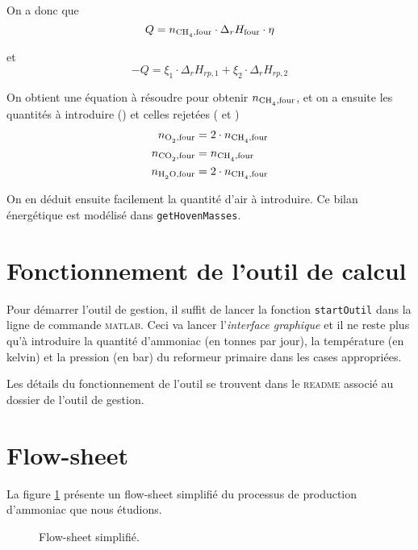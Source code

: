 On a donc que 
\[
	Q = n_{\ce{CH4},\text{four}} \cdot \Delta_r H_{\text{four}} \cdot \eta
\]

et 
\[
	-Q = \xi_1 \cdot \Delta_r H_{rp,1} + \xi_2 \cdot \Delta_r H_{rp,2}
\]

On obtient une équation à résoudre pour obtenir $n_{\ce{CH4},\text{four}}$, et on a ensuite
les quantités à introduire () et celles rejetées ( et )
\begin{align*}
	n_{\ce{O2},\text{four}} &= 2 \cdot n_{\ce{CH4},\text{four}} \\
	n_{\ce{CO2},\text{four}} &= n_{\ce{CH4},\text{four}} \\
	n_{\ce{H2O},\text{four}} &= 2 \cdot n_{\ce{CH4},\text{four}}
\end{align*}

On en déduit ensuite facilement la quantité d'air à introduire.
Ce bilan énergétique est modélisé dans \texttt{getHovenMasses}.



\section{Fonctionnement de l'outil de calcul}

Pour démarrer l'outil de gestion, il suffit de lancer la fonction \texttt{startOutil}
dans la ligne de commande \textsc{matlab}.
Ceci va lancer l'\emph{interface graphique} et il ne reste plus qu'à introduire
la quantité d'ammoniac (en tonnes par jour), la température (en kelvin) et
la pression (en bar) du reformeur primaire dans les cases appropriées.

Les détails du fonctionnement de l'outil se trouvent
dans le \textsc{readme} associé au dossier de l'outil de gestion.

\section{Flow-sheet}
\label{sec:flowsheet}

La figure \ref{fig:flowsheet} présente un flow-sheet simplifié du processus 
de production d'ammoniac que nous étudions.

\begin{figure}
	\begin{center}
		
	\end{center}
	\caption{Flow-sheet simplifié.}
	\label{fig:flowsheet}
\end{figure}

